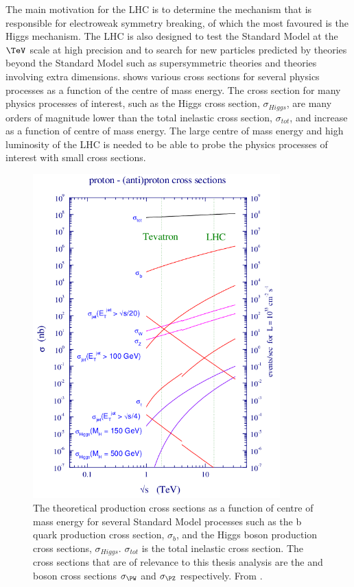 The main motivation for the LHC is to determine the mechanism that is
responsible for electroweak symmetry breaking, of which the most favoured is the
Higgs mechanism.  The LHC is also designed to test the Standard Model at the
$\TeV$ scale at high precision and to search for new particles predicted by
theories beyond the Standard Model such as supersymmetric theories and theories
involving extra dimensions.   shows various cross
sections for several physics processes as a function of the centre of mass
energy. The cross section for many physics processes of interest, such as the
Higgs cross section, $\sigma_{Higgs}$, are many orders of magnitude lower than the
total inelastic cross section, $\sigma_{tot}$, and increase as a function of
centre of mass energy.  The large centre of mass energy and high luminosity of
the LHC is needed to be able to probe the physics processes of interest with
small cross sections.

\begin{figure}[htbp]
  \centering
  \includegraphics[width=0.85\textwidth]{xsec.png}
  \caption[The theoretical production cross sections as a function of centre of
mass energy for several Standard Model processes.] {The theoretical production
cross sections as a function of centre of mass energy for several Standard Model
processes such as the b quark production cross section, $\sigma_{b}$, and the
Higgs boson production cross sections, $\sigma_{Higgs}$.  $\sigma_{tot}$ is the
total inelastic cross section.  The cross sections that are of relevance to this
thesis analysis are the \PW and \PZ boson cross sections $\sigma_{\PW}$ and
$\sigma_{\PZ}$ respectively.  From \cite{campbell2006hard}.}

  \label{fig:LHCxsec}
\end{figure}

